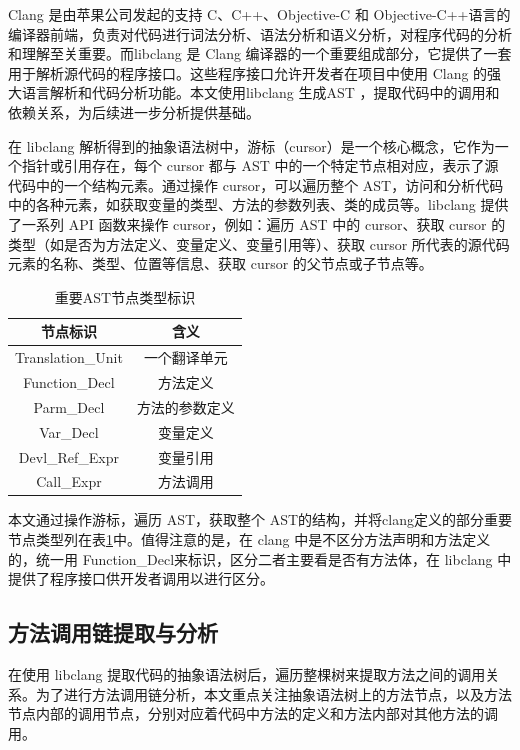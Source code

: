 Clang 是由苹果公司发起的支持 C、C++、Objective-C 和 Objective-C++语言的编译器前端，负责对代码进行词法分析、语法分析和语义分析，对程序代码的分析和理解至关重要\cite{clang}。而libclang 是 Clang 编译器的一个重要组成部分，它提供了一套用于解析源代码的程序接口。这些程序接口允许开发者在项目中使用 Clang 的强大语言解析和代码分析功能\cite{libclang}。本文使用libclang 生成AST ，提取代码中的调用和依赖关系，为后续进一步分析提供基础。

在 libclang 解析得到的抽象语法树中，游标（cursor）是一个核心概念，它作为一个指针或引用存在，每个 cursor 都与 AST 中的一个特定节点相对应，表示了源代码中的一个结构元素。通过操作 cursor，可以遍历整个 AST，访问和分析代码中的各种元素，如获取变量的类型、方法的参数列表、类的成员等。libclang 提供了一系列 API 函数来操作 cursor，例如：遍历 AST 中的 cursor、获取 cursor 的类型（如是否为方法定义、变量定义、变量引用等）、获取 cursor 所代表的源代码元素的名称、类型、位置等信息、获取 cursor 的父节点或子节点等。

\begin{table}[htbp]
\caption{重要AST节点类型标识}
\label{1_重要AST节点类型标识}
\vspace{0.5em}\centering\wuhao
\begin{tabular}{cc}
\toprule
节点标识 & 含义  \\
\midrule
Translation\_Unit & 一个翻译单元 \\
Function\_Decl  & 方法定义 \\
Parm\_Decl & 方法的参数定义 \\
Var\_Decl & 变量定义 \\ 
Devl\_Ref\_Expr  & 变量引用  \\
Call\_Expr  & 方法调用  \\
\bottomrule
\end{tabular}
\end{table}   

本文通过操作游标，遍历 AST，获取整个 AST的结构，并将clang定义的部分重要节点类型列在表\ref{1_重要AST节点类型标识}中。值得注意的是，在 clang 中是不区分方法声明和方法定义的，统一用 Function\_Decl来标识，区分二者主要看是否有方法体，在 libclang 中提供了程序接口供开发者调用以进行区分。

\subsection{方法调用链提取与分析}
在使用 libclang 提取代码的抽象语法树后，遍历整棵树来提取方法之间的调用关系。为了进行方法调用链分析，本文重点关注抽象语法树上的方法节点，以及方法节点内部的调用节点，分别对应着代码中方法的定义和方法内部对其他方法的调用。


